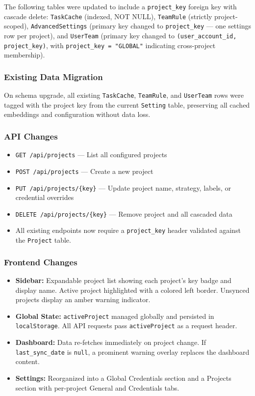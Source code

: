 \documentclass[12pt, a4paper]{article}
\begin{document}
The following tables were updated to include a \texttt{project\_key} foreign key with cascade delete: \texttt{TaskCache} (indexed, NOT NULL), \texttt{TeamRule} (strictly project-scoped), \texttt{AdvancedSettings} (primary key changed to \texttt{project\_key} — one settings row per project), and \texttt{UserTeam} (primary key changed to \texttt{(user\_account\_id, project\_key)}, with \texttt{project\_key = "GLOBAL"} indicating cross-project membership).

\subsubsection{Existing Data Migration}

On schema upgrade, all existing \texttt{TaskCache}, \texttt{TeamRule}, and \texttt{UserTeam} rows were tagged with the project key from the current \texttt{Setting} table, preserving all cached embeddings and configuration without data loss.

\subsubsection{API Changes}

\begin{itemize}
    \item \texttt{GET /api/projects} — List all configured projects
    \item \texttt{POST /api/projects} — Create a new project
    \item \texttt{PUT /api/projects/\{key\}} — Update project name, strategy, labels, or credential overrides
    \item \texttt{DELETE /api/projects/\{key\}} — Remove project and all cascaded data
    \item All existing endpoints now require a \texttt{project\_key} header validated against the \texttt{Project} table.
\end{itemize}

\subsubsection{Frontend Changes}

\begin{itemize}
    \item \textbf{Sidebar:} Expandable project list showing each project's key badge and display name. Active project highlighted with a colored left border. Unsynced projects display an amber warning indicator.
    \item \textbf{Global State:} \texttt{activeProject} managed globally and persisted in \texttt{localStorage}. All API requests pass \texttt{activeProject} as a request header.
    \item \textbf{Dashboard:} Data re-fetches immediately on project change. If \texttt{last\_sync\_date} is \texttt{null}, a prominent warning overlay replaces the dashboard content.
    \item \textbf{Settings:} Reorganized into a Global Credentials section and a Projects section with per-project General and Credentials tabs.
\end{itemize}
\end{document}
